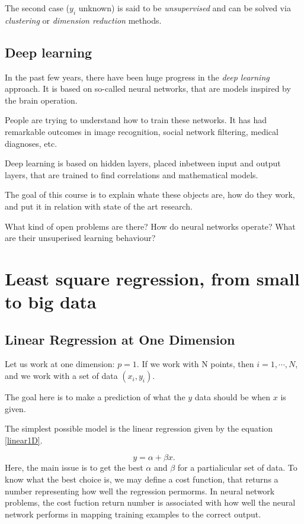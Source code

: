 \documentclass[a4paper]{tufte-book}
\begin{document}
The second case ($y_i$ unknown) is said to be \emph{unsupervised} and can be
solved via \emph{clustering} or \emph{dimension reduction} methods.

\section*{Deep learning}

In the past few years, there have been huge progress in the \emph{deep learning}
approach. It is based on so-called neural networks, that are models inspired
by the brain operation.

People are trying to understand how to train these networks. It has had
remarkable outcomes in image recognition, social network filtering, medical
diagnoses, etc.

Deep learning is based on hidden layers, placed inbetween input and output
layers, that are trained to find correlations and mathematical models.

The goal of this course is to explain whate these objects are, how do they work,
and put it in relation with state of the art research.

What kind of open problems are there? How do neural networks operate? What are
their unsuperised learning behaviour?


\tableofcontents\thispagestyle{empty}

\mainmatter

\chapter{Least square regression, from small to big data}
\label{ch:least-square}

\section{Linear Regression at One Dimension}

Let us work at one dimension: $p =1$. If we work with N points, then
$i=1,\cdots,N$, and we work with a set of data $(x_i,y_i)$.

The goal here is to make a prediction of what the $y$ data should be when $x$ is
given.

The simplest possible model is the linear regression given by the equation 
\ref{linear1D}.

\begin{equation}
    y=\alpha + \beta x.
    \label{linear1D}
\end{equation}
Here, the main issue is to get the best $\alpha$ and $\beta$ for a partialicular
set of data. To know what the best choice is, we may define a cost function,
that returns a number representing how well the regression permorms. In neural
network problems, the cost fuction return number is associated with how well the
neural network performs in mapping training examples to the correct output.
\end{document}
